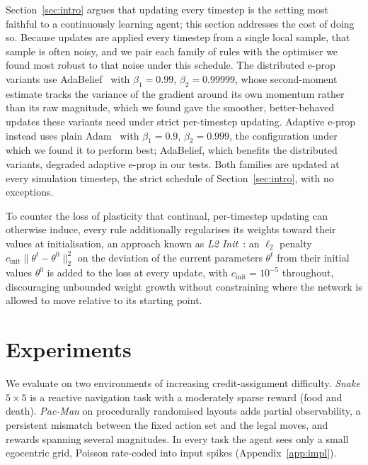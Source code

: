 \documentclass[10pt,twocolumn]{article}
\begin{document}
Section~\ref{sec:intro} argues that updating every timestep is the setting
most faithful to a continuously learning agent; this section addresses the
cost of doing so.
Because updates are applied every timestep from a single local sample, that
sample is often noisy, and we pair each family of rules with the optimiser we
found most robust to that noise under this schedule. The distributed e-prop
variants use AdaBelief~\citep{zhuang2020adabelief} with $\beta_1=0.99$,
$\beta_2=0.99999$, whose second-moment estimate tracks the variance of the
gradient around its own momentum rather than its raw magnitude, which we
found gave the smoother, better-behaved updates these variants need under
strict per-timestep updating. Adaptive e-prop instead uses plain
Adam~\citep{kingma2014adam} with $\beta_1=0.9$, $\beta_2=0.999$, the
configuration under which we found it to perform best; AdaBelief, which
benefits the distributed variants, degraded adaptive e-prop in our tests. Both families are
updated at every simulation timestep, the strict schedule of
Section~\ref{sec:intro}, with no exceptions.

To counter the loss of plasticity that continual, per-timestep updating can
otherwise induce, every rule additionally regularises its weights toward
their values at initialisation, an approach known as \emph{L2
Init}~\citep{kumar2023maintaining}: an $\ell_2$ penalty
$c_{\mathrm{init}}\lVert\theta^t-\theta^0\rVert_2^2$ on the deviation of the
current parameters $\theta^t$ from their initial values $\theta^0$ is added
to the loss at every update, with $c_{\mathrm{init}}=10^{-5}$ throughout,
discouraging unbounded weight growth without constraining where the network
is allowed to move relative to its starting point.
\section{Experiments}
\label{sec:results}

We evaluate on two environments of increasing credit-assignment difficulty.
\emph{Snake} $5\times5$ is a reactive navigation task with a moderately sparse
reward (food and death). \emph{Pac-Man} on procedurally randomised layouts adds
partial observability, a persistent mismatch between the fixed action set and
the legal moves, and rewards spanning several magnitudes. In every task the agent sees only a small egocentric
grid, Poisson rate-coded into input spikes (Appendix~\ref{app:impl}).
\end{document}

